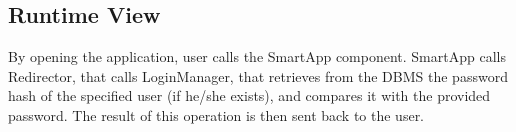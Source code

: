 \subsection{Runtime View}
\begin{figure}[H]
	\noindent
\end{figure}
By opening the application, user calls the SmartApp component. SmartApp calls Redirector, that calls LoginManager, that retrieves from the DBMS the password hash of the specified user (if he/she exists), and compares it with the provided password. The result of this operation is then sent back to the user.\\
\begin{figure}[H]
	\noindent
\end{figure}
